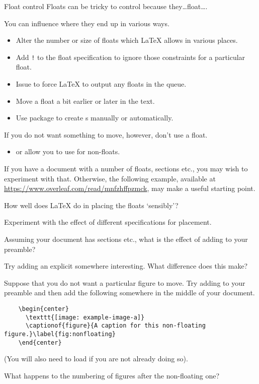 \begin{frame}{Float control}
	Floats can be tricky to control because they\dots float\dots.

	You can influence where they end up in various ways.
	  \begin{itemize}
		\item Alter the number or size of floats which \LaTeX{} allows in various places.
		\item Add \texttt{!} to the float specification to ignore those constraints for a particular float.
		\item Issue  to force \LaTeX{} to output any floats in the queue.
		\item Move a float a bit earlier or later in the text.
        \item Use package  to create s manually or automatically.
	  \end{itemize}

	If you do not want something to move, however, don't use a float.
	\begin{itemize}
	  \item {} or  allow you to use  for non-floats.
	\end{itemize}
\end{frame}

\begin{exercise}
  \label{ex:floatmanagement}%
  If you have a document with a number of floats, sections etc., you may wish to experiment with that.
  Otherwise, the following example, available at \url{https://www.overleaf.com/read/mnfzhffpzmck}, may make a useful starting point.
  

  How well does \LaTeX{} do in placing the floats ‘sensibly’?

  Experiment with the effect of different specifications for placement.

  Assuming your document has sections etc., what is the effect of adding  to your preamble?

  Try adding an explicit  somewhere interesting.
  What difference does this make?

  Suppose that you do not want a particular figure to move.
  Try adding  to your preamble and then add the following somewhere in the middle of your document.
  \begin{verbatim}
    \begin{center}
      \texttt{[image: example-image-a]}
      \captionof{figure}{A caption for this non-floating figure.}\label{fig:nonfloating}
    \end{center}
  \end{verbatim}
  (You will also need to load  if you are not already doing so).

  What happens to the numbering of figures after the non-floating one?
\end{exercise}

